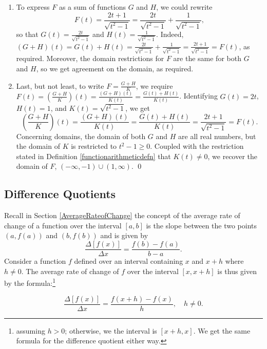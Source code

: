 \begin{ex}
\begin{enumerate}
\begin{enumerate}
\item  To express $F$ as a sum of functions $G$ and $H$, we could rewrite \[ F(t) =  \dfrac{2t+1}{\sqrt{t^2-1}} = \dfrac{2t}{\sqrt{t^2-1}} + \dfrac{1}{\sqrt{t^2-1}},\] so that $G(t) =  \frac{2t}{\sqrt{t^2-1}}$ and $H(t) =  \frac{1}{\sqrt{t^2-1}}$.  Indeed, $(G+H)(t) = G(t)+H(t) =  \frac{2t}{\sqrt{t^2-1}} +  \frac{1}{\sqrt{t^2-1}} = \frac{2t+1}{\sqrt{t^2-1}} = F(t)$, as required.  Moreover, the domain restrictions for $F$ are the same for both $G$ and $H$, so we get agreement on the domain, as required.

\item Last, but not least, to write $F = \frac{G+H}{K}$, we require $F(t) =\left(\frac{G+H}{K}\right)(t) = \frac{(G+H)(t)}{K(t)} = \frac{G(t)+H(t)}{K(t)}$.  Identifying $G(t) = 2t$, $H(t) = 1$, and $K(t) = \sqrt{t^2-1}$, we get \[\left(\dfrac{G+H}{K}\right)(t) = \dfrac{(G+H)(t)}{K(t)} = \dfrac{G(t) + H(t)}{K(t)} = \dfrac{2t+1}{\sqrt{t^2-1}} = F(t).\]  Concerning domains, the domain of both $G$ and $H$ are all real numbers, but the domain of $K$ is restricted to $t^2-1 \geq 0$.  Coupled with the restriction stated in Definition \ref{functionarithmeticdefn} that $K(t) \neq 0$, we recover the domain of $F$, $(-\infty, -1) \cup (1, \infty)$. \qed

\end{enumerate}

\end{enumerate}

\end{ex}

\subsection{Difference Quotients}
\label{differencequotients}

Recall  in Section \ref{AverageRateofChange} the concept of the average rate of change of a function over the interval $[a,b]$  is the slope between the two points $(a, f(a))$ and $(b, f(b))$ and is given by \[ \dfrac{\Delta[f(x)]}{\Delta x} = \dfrac{f(b)-f(a)}{b-a}.\]
Consider a function $f$ defined over an interval containing $x$ and $x+h$ where $h \neq 0$. The average rate of change of $f$ over the interval $[x,x+h]$ is thus given by the formula:\footnote{assuming $h>0$;  otherwise, we  the interval is $[x+h, x]$.  We get the same formula for the difference quotient either way.}

\[ \dfrac{\Delta[f(x)]}{\Delta x} = \dfrac{f(x+h)-f(x)}{h}, \quad h \neq 0.\]

